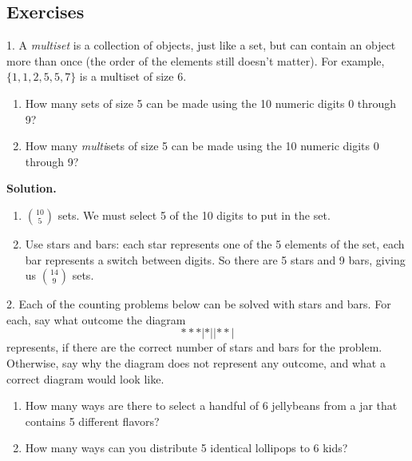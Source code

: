 \documentclass[10pt,]{book}
\theoremstyle{plain}
\theoremstyle{definition}
\theoremstyle{definition}
\theoremstyle{definition}
\numberwithin{equation}{section}
\begin{document}
\subsection[Exercises]{Exercises}\label{exercises-8}
\begin{exerciselist}
\item[1.]\hypertarget{exercise-82}{}
A \emph{multiset} is a collection of objects, just like a set, but can contain an object more than once (the order of the elements still doesn't matter). For example, \(\{1,1, 2, 5, 5, 7\}\) is a multiset of size 6.
%
\leavevmode%
\begin{enumerate}[label=(\alph*)]
\item\hypertarget{li-572}{}
How many sets of size 5 can be made using the 10 numeric digits 0 through 9?
%
\item\hypertarget{li-573}{}
How many \emph{multi}sets of size 5 can be made using the 10 numeric digits 0 through 9?
%
\end{enumerate}
\par\smallskip
\par\smallskip
\noindent\textbf{Solution.}\hypertarget{solution-122}{}\quad
\leavevmode%
\begin{enumerate}[label=(\alph*)]
\item\hypertarget{li-574}{}\({10\choose 5}\) sets.  We must select 5 of the 10 digits to put in the set.%
\item\hypertarget{li-575}{}
Use stars and bars: each star represents one of the 5 elements of the set, each bar represents a switch between digits.  So there are 5 stars and 9 bars, giving us \({14 \choose 9}\) sets.
%
\end{enumerate}
\item[2.]\hypertarget{exercise-83}{}
Each of the counting problems below can be solved with stars and bars. For each, say what outcome the diagram
\begin{equation*}
  ***|*||**|
\end{equation*}
represents, if there are the correct number of stars and bars for the problem. Otherwise, say why the diagram does not represent any outcome, and what a correct diagram would look like.
%
\leavevmode%
\begin{enumerate}[label=(\alph*)]
\item\hypertarget{li-576}{}
How many ways are there to select a handful of 6 jellybeans from a jar that contains 5 different flavors?
%
\item\hypertarget{li-577}{}
How many ways can you distribute 5 identical lollipops to 6 kids?

\end{enumerate}
\end{exerciselist}
\end{document}
